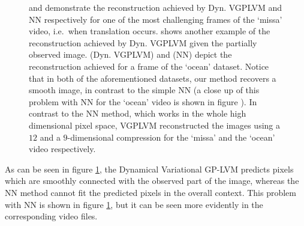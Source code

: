 \begin{figure}[ht]
\begin{center}
{	\label{fig:ocean3}
}
      

\end{center}
\caption{\small{
     and  demonstrate the reconstruction achieved by Dyn. VGPLVM and NN respectively for one of the most challenging frames  of the `missa' video, i.e.\ when translation occurs.  shows another example of the reconstruction achieved by Dyn. VGPLVM given the partially observed image.  (Dyn. VGPLVM) and  (NN) depict the reconstruction achieved for a frame of the `ocean' dataset. %
Notice that in both of the aforementioned datasets, our method recovers a smooth image, in contrast to the simple NN (a close up of this problem with NN for the `ocean' video is shown in figure ). In contrast to the NN method, which works in the whole high dimensional pixel space, VGPLVM reconstructed the images using a $12$ and a $9$-dimensional compression for the `missa' and the `ocean' video respectively.
}
}
\label{fig:video1}
\end{figure}
As can be seen in figure \ref{fig:video1}, the Dynamical Variational GP-LVM predicts pixels which
are smoothly connected with the observed part of the image, whereas the NN method cannot fit the predicted pixels in the overall context.
This problem with NN is shown in figure \ref{fig:video1}, but it can be seen more evidently in the corresponding video files.

